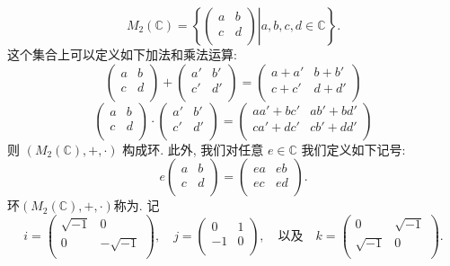 \documentclass[a4paper,12pt]{article}
\begin{document}
\begin{enumerate}
 \[M_2(\mathbb C)=\left\{\left.\begin{pmatrix} a & b \\ c & d\\\end{pmatrix}\right|a,b,c,d\in\mathbb C\right\}.\]
 这个集合上可以定义如下加法和乘法运算:
 \[\begin{pmatrix} a & b \\ c & d\\\end{pmatrix} + \begin{pmatrix} a' & b' \\ c' & d'\\\end{pmatrix} = \begin{pmatrix} a+a' & b+b' \\ c+c' & d+d' \\\end{pmatrix} \]
 \[\begin{pmatrix} a & b \\ c & d\\\end{pmatrix} \cdot \begin{pmatrix} a' & b' \\ c' & d'\\\end{pmatrix} = \begin{pmatrix} aa'+bc' & ab'+bd' \\ ca'+dc' & cb'+dd' \\\end{pmatrix} \]
 则 $(M_2(\mathbb C),+,\cdot)$ 构成环. 此外, 我们对任意 $e\in\mathbb C$ 我们定义如下记号:
 \[e\begin{pmatrix} a & b \\ c & d\\\end{pmatrix} = \begin{pmatrix} ea & eb \\ ec & ed\\\end{pmatrix}.\]
 环$(M_2(\mathbb C),+,\cdot)$称为{\color{blue}{复数域上的二阶矩阵代数}}.
 记 
 \[i=\begin{pmatrix} \sqrt{-1} & 0 \\ 0 & -\sqrt{-1} \\ \end{pmatrix}, \quad j=\begin{pmatrix} 0 & 1 \\ -1 & 0 \\ \end{pmatrix}, \quad \text{以及} \quad k=\begin{pmatrix} 0 & \sqrt{-1} \\ \sqrt{-1} & 0 \\ \end{pmatrix}.\]

\end{enumerate}
\end{document}
